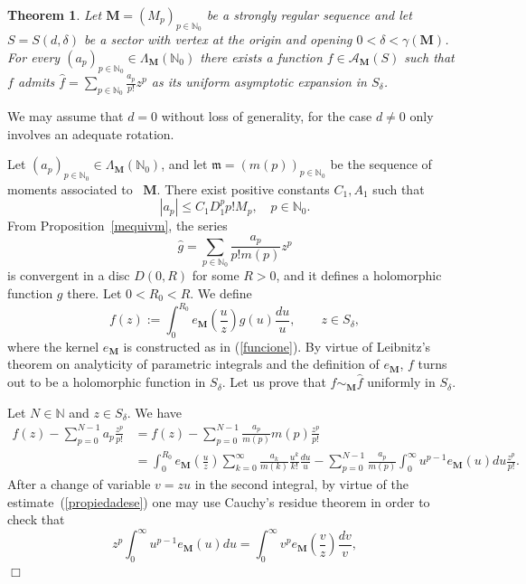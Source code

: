 \documentclass[11pt,a4paper,leqno]{article}
\theoremstyle{plain}
\newtheorem{theo}{Theorem}[section]
\theoremstyle{definition}
\newenvironment{proof1}{\medskip\par\noindent{\bf Proof}}{\hfill $\Box$
\medskip\par}
\def\N{\mathbb{N}}
\def\bM{\boldsymbol{M}}
\begin{document}
\begin{theo}\label{tpral}
Let $\bM=(M_{p})_{p\in\N_0}$ be a strongly regular sequence and let $S=S(d,\delta)$ be a sector with vertex at the origin and opening $0<\delta<\gamma(\bM)$. For every $(a_{p})_{p\in\N_0}\in\Lambda_{\bM}(\N_{0})$ there exists a function $f\in\mathcal{A}_{\bM}(S)$ such that $f$ admits $\hat{f}=\sum_{p\in\N_0}\frac{a_p}{p!}z^p$ as its uniform asymptotic expansion in $S_{\delta}$.
\end{theo}
\begin{proof1}
We may assume that $d=0$ without loss of generality, for the case $d\neq0$ only involves an adequate rotation.

Let $(a_{p})_{p\in\N_0}\in\Lambda_{\bM}(\N_0)$, and let $\mathfrak{m}=(m(p))_{p\in\N_0}$ be the sequence of moments associated to~ $\bM$.
There exist positive constants $C_1,A_1$ such that
\begin{equation}\label{equatBoundsLambdaMA}
|a_p|\le C_1D_1^{p}p!M_p,\quad p\in\N_0.
\end{equation}
From Proposition~\ref{mequivm}, the series
$$
\hat{g}=\sum_{p\in\N_0}\frac{a_p}{p!m(p)}z^p
$$
is convergent in a disc $D(0,R)$ for some $R>0$, and it defines a holomorphic function $g$ there. Let $0<R_0<R$.
We define
\begin{equation}\label{intope}
f(z):=\int_{0}^{R_0}e_{\bM}\left(\frac{u}{z}\right)g(u)\frac{du}{u},\qquad z\in S_{\delta},
\end{equation}
where the kernel $e_{\bM}$ is constructed as in (\ref{funcione}).
By virtue of Leibnitz's theorem on analyticity of parametric integrals and the definition of $e_{\bM}$, $f$ turns out to be a holomorphic function in $S_{\delta}$. Let us prove that
$f\sim_{\bM}\hat{f}$ uniformly in $S_{\delta}$.\par
Let $N\in\N$ and $z\in S_{\delta}$. We have
\begin{align*}
f(z)-\sum_{p=0}^{N-1}a_p\frac{z^p}{p!} &= f(z)-\sum_{p=0}^{N-1}\frac{a_p}{m(p)}m(p)\frac{z^p}{p!}\\
&= \int_{0}^{R_0}e_{\bM}\left(\frac{u}{z}\right)\sum_{k=0}^{\infty}\frac{a_{k}}{m(k)}\frac{u^k}{k!}\frac{du}{u} -\sum_{p=0}^{N-1}\frac{a_p}{m(p)}\int_{0}^{\infty}u^{p-1}e_{\bM}(u)du\frac{z^p}{p!}.
\end{align*}
After a change of variable $v=zu$ in the second integral, by virtue of the estimate~(\ref{propiedadese}) one may use Cauchy's residue theorem in order to check that
$$
z^p\int_{0}^{\infty}u^{p-1}e_{\bM}(u)du= \int_{0}^{\infty}v^{p}e_{\bM}\left(\frac{v}{z}\right)\frac{dv}{v},
$$
\end{proof1}
\end{document}
